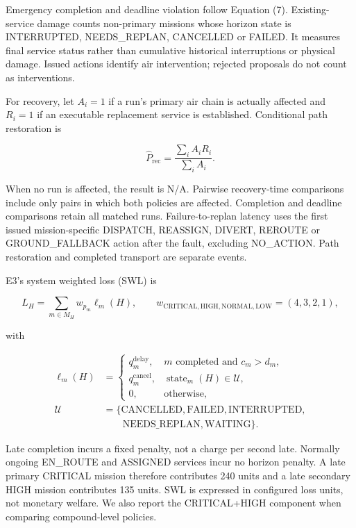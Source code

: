 \documentclass[]{interact}
\theoremstyle{plain}
\theoremstyle{definition}
\theoremstyle{remark}
\begin{document}
Emergency completion and deadline violation follow Equation (7). Existing-service damage counts non-primary missions whose horizon state is INTERRUPTED, NEEDS\_REPLAN, CANCELLED or FAILED. It measures final service status rather than cumulative historical interruptions or physical damage. Issued actions identify air intervention; rejected proposals do not count as interventions.

For recovery, let $A_i=1$ if a run's primary air chain is actually affected and $R_i=1$ if an executable replacement service is established. Conditional path restoration is

\begin{equation*}
\widehat P_{\mathrm{rec}}=\frac{\sum_i A_iR_i}{\sum_i A_i}. \tag{10}
\end{equation*}

When no run is affected, the result is N/A. Pairwise recovery-time comparisons include only pairs in which both policies are affected. Completion and deadline comparisons retain all matched runs. Failure-to-replan latency uses the first issued mission-specific DISPATCH, REASSIGN, DIVERT, REROUTE or GROUND\_FALLBACK action after the fault, excluding NO\_ACTION. Path restoration and completed transport are separate events.

E3's system weighted loss (SWL) is

\begin{equation*}
L_H=\sum_{m\in M_H}w_{p_m}\ell_m(H),\qquad
w_{\mathrm{CRITICAL,HIGH,NORMAL,LOW}}=(4,3,2,1), \tag{11}
\end{equation*}

with

\begin{equation*}
\begin{aligned}
\ell_m(H)&=\begin{cases}
q_m^{\mathrm{delay}},&m\text{ completed and }c_m>d_m,\\
q_m^{\mathrm{cancel}},&\operatorname{state}_m(H)\in\mathcal U,\\
0,&\text{otherwise},
\end{cases}
\\[4pt]
\mathcal U&=\{\mathrm{CANCELLED,FAILED,INTERRUPTED},
\\&\qquad\mathrm{NEEDS\_REPLAN,WAITING}\}.
\end{aligned}\tag{12}
\end{equation*}

Late completion incurs a fixed penalty, not a charge per second late. Normally ongoing EN\_ROUTE and ASSIGNED services incur no horizon penalty. A late primary CRITICAL mission therefore contributes 240 units and a late secondary HIGH mission contributes 135 units. SWL is expressed in configured loss units, not monetary welfare. We also report the CRITICAL+HIGH component when comparing compound-level policies.
\end{document}

